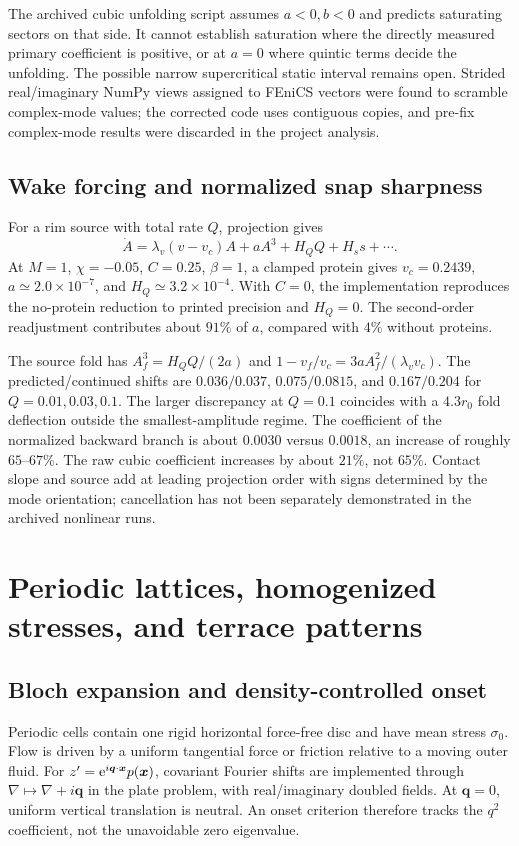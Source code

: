The archived cubic unfolding script assumes $a<0,b<0$ and predicts saturating sectors on that side. It cannot establish saturation where the directly measured primary coefficient is positive, or at $a=0$ where quintic terms decide the unfolding. The possible narrow supercritical static interval remains open. Strided real/imaginary NumPy views assigned to FEniCS vectors were found to scramble complex-mode values; the corrected code uses contiguous copies, and pre-fix complex-mode results were discarded in the project analysis.

\subsection{Wake forcing and normalized snap sharpness}
For a rim source with total rate $Q$, projection gives
\begin{equation}
\dot A=\lambda_v(v-v_c)A+aA^3+H_QQ+H_s s+\cdots .
\end{equation}
At $M=1$, $\chi=-0.05$, $C=0.25$, $\beta=1$, a clamped protein gives $v_c=0.2439$, $a\simeq2.0\times10^{-7}$, and $H_Q\simeq3.2\times10^{-4}$. With $C=0$, the implementation reproduces the no-protein reduction to printed precision and $H_Q=0$. The second-order readjustment contributes about $91\%$ of $a$, compared with $4\%$ without proteins.

The source fold has $A_f^3=H_QQ/(2a)$ and $1-v_f/v_c=3aA_f^2/(\lambda_vv_c)$. The predicted/continued shifts are $0.036/0.037$, $0.075/0.0815$, and $0.167/0.204$ for $Q=0.01,0.03,0.1$. The larger discrepancy at $Q=0.1$ coincides with a $4.3r_0$ fold deflection outside the smallest-amplitude regime. The coefficient of the normalized backward branch is about $0.0030$ versus $0.0018$, an increase of roughly $65$--$67\%$. The raw cubic coefficient increases by about $21\%$, not $65\%$. Contact slope and source add at leading projection order with signs determined by the mode orientation; cancellation has not been separately demonstrated in the archived nonlinear runs.

\section{Periodic lattices, homogenized stresses, and terrace patterns}
\subsection{Bloch expansion and density-controlled onset}
Periodic cells contain one rigid horizontal force-free disc and have mean stress $\sigma_0$. Flow is driven by a uniform tangential force or friction relative to a moving outer fluid. For $z'=\mathrm{e}^{i\bm q\cdot\bm x}p(\bm x)$, covariant Fourier shifts are implemented through $\nabla\mapsto\nabla+i\bm q$ in the plate problem, with real/imaginary doubled fields. At $\bm q=0$, uniform vertical translation is neutral. An onset criterion therefore tracks the $q^2$ coefficient, not the unavoidable zero eigenvalue.


